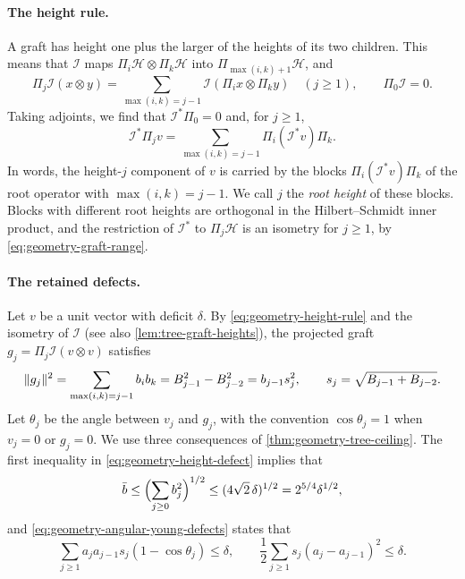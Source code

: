 \paragraph{The height rule.}
A graft has height one plus the larger of the heights of its two children. This means that $\mathcal I$ maps $\Pi_i\mathcal H\otimes\Pi_k\mathcal H$ into $\Pi_{\max(i,k)+1}\mathcal H$, and
\begin{equation}\label{eq:geometry-height-rule}
 \Pi_j\mathcal I(x\otimes y)=\sum_{\max(i,k)=j-1}\mathcal I(\Pi_ix\otimes\Pi_ky)\quad(j\ge1),
 \qquad \Pi_0\mathcal I=0 .
\end{equation}
Taking adjoints, we find that $\mathcal I^*\Pi_0=0$ and, for $j\ge1$,
\begin{equation}\label{eq:geometry-root-blocks}
 \mathcal I^*\Pi_jv=\sum_{\max(i,k)=j-1}\Pi_i(\mathcal I^*v)\Pi_k .
\end{equation}
In words, the height-$j$ component of $v$ is carried by the blocks $\Pi_i(\mathcal I^*v)\Pi_k$ of the root operator with $\max(i,k)=j-1$. We call $j$ the \emph{root height} of these blocks. Blocks with different root heights are orthogonal in the Hilbert--Schmidt inner product, and the restriction of $\mathcal I^*$ to $\Pi_j\mathcal H$ is an isometry for $j\ge1$, by \eqref{eq:geometry-graft-range}.

\paragraph{The retained defects.}
Let $v$ be a unit vector with deficit $\delta$. By \eqref{eq:geometry-height-rule} and the isometry of $\mathcal I$ (see also \cref{lem:tree-graft-heights}), the projected graft $g_j=\Pi_j\mathcal I(v\otimes v)$ satisfies
\begin{equation}\label{eq:geometry-graft-norm}
 \lVert g_j\rVert^2=\sum_{\max(i,k)=j-1}b_ib_k=B_{j-1}^2-B_{j-2}^2=b_{j-1}s_j^2,
 \qquad s_j=\sqrt{B_{j-1}+B_{j-2}} .
\end{equation}
Let $\theta_j$ be the angle between $v_j$ and $g_j$, with the convention $\cos\theta_j=1$ when $v_j=0$ or $g_j=0$. We use three consequences of \cref{thm:geometry-tree-ceiling}. The first inequality in \eqref{eq:geometry-height-defect} implies that
\begin{equation}\label{eq:geometry-mesh-bound}
 \bar b\le\Bigl(\sum_{j\ge0}b_j^2\Bigr)^{1/2}\le(4\sqrt2\,\delta)^{1/2}=2^{5/4}\delta^{1/2},
\end{equation}
and \eqref{eq:geometry-angular-young-defects} states that
\begin{equation}\label{eq:geometry-retained-recalled}
 \sum_{j\ge1}a_ja_{j-1}s_j(1-\cos\theta_j)\le\delta,
 \qquad
 \frac12\sum_{j\ge1}s_j(a_j-a_{j-1})^2\le\delta .
\end{equation}

